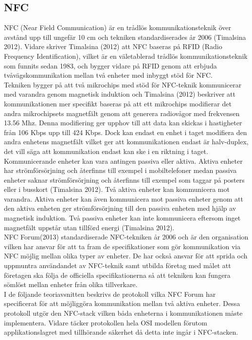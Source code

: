 \documentclass[11pt]{article}
\begin{document}
\subsection{NFC}
NFC (Near Field Communication) är en trådlös kommunikationsteknik över avstånd upp till ungefär 10 cm och tekniken standardiserades år 2006 (Timalsina 2012). Vidare skriver Timalsina (2012) att NFC baseras på RFID (Radio Frequency Identification), vilket är en väletablerad trådlös kommunikationsteknik som funnits sedan 1983, och bygger vidare på RFID genom att erbjuda tvåvägskommunikation mellan två enheter med inbyggt stöd för NFC.\\ 
Tekniken bygger på att två mikrochips med stöd för NFC-teknik kommunicerar med varandra genom magnetisk induktion och Timalsina (2012) beskriver att kommunikationen mer specifikt baseras på att ett mikrochips modifierar det andra mikrochipsets magnetfält genom att generera radiovågor med frekvensen 13.56 Mhz. Denna modifiering ger upphov till att data kan skickas i hastigheter från 106 Kbps upp till 424 Kbps. Dock kan endast en enhet i taget modifiera den andra enhetens magnetfält vilket ger att kommunikationen endast är halv-duplex, det vill säga att kommunikation endast kan ske i en riktning i taget.\\
Kommunicerande enheter kan vara antingen passiva eller aktiva. Aktiva enheter har strömförsörjning och återfinns till exempel i mobiltelefoner medan passiva enheter saknar strömförsörjning och återfinns till exempel som taggar på posters eller i busskort (Timalsina 2012). Två aktiva enheter kan kommunicera mot varandra. Aktiva enheter kan även kommunicera mot passiva enheter genom att den aktiva enheten ger strömförsörjning till den passiva enheten med hjälp av magnetisk induktion. Två passiva enheter kan inte kommunicera eftersom inget magnetfält uppstår utan tillförd energi (Timalsina 2012).\\
NFC Forum(2013) standardiserade NFC-tekniken år 2006 och är den organisation vilken har ansvar för att ta fram de specifikationer som gör kommunikation via NFC möjlig mellan olika typer av enheter. De har också ansvar för att sprida och uppmuntra användandet av NFC-teknik samt utbilda företag med målet att företagen ska följa de officiella specifikationerna så att tekniken kan fungera sömlöst mellan enheter från olika tillverkare.\\
I de följande teoriavsnitten beskrivs de protokoll vilka NFC Forum har specificerat för att möjliggöra kommunikation mellan två aktiva enheter. Dessa protokoll utgör den NFC-stack vilken båda enheterna i kommunikationen måste implementera. Vidare täcker protokollen hela OSI modellen förutom applikationslagret med tillhörande säkerhet då detta inte ingår i NFC-stacken.
\end{document}
